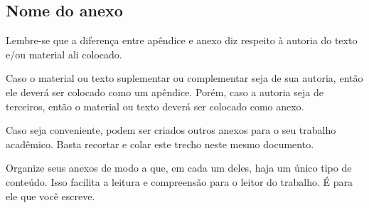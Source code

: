 
\begin{anexosenv}
    \partanexos


    \chapter{Nome do anexo}
    \label{chap_anexo_a}

    Lembre-se que a diferença entre apêndice e anexo diz respeito à autoria do texto e/ou material ali colocado.

    Caso o material ou texto suplementar ou complementar seja de sua autoria, então ele deverá ser colocado como um apêndice.
    Porém, caso a autoria seja de terceiros, então o material ou texto deverá ser colocado como anexo.

    Caso seja conveniente, podem ser criados outros anexos para o seu trabalho acadêmico.
    Basta recortar e colar este trecho neste mesmo documento.

    Organize seus anexos de modo a que, em cada um deles, haja um único tipo de conteúdo.
    Isso facilita a leitura e compreensão para o leitor do trabalho. É para ele que você escreve.

\end{anexosenv}
